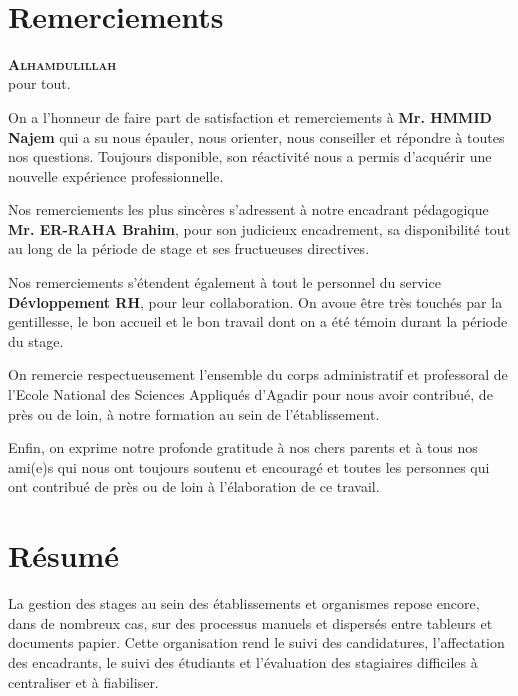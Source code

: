 \documentclass[14pt,a4paper]{article}
\begin{document}
\newpage
\

\vspace*{4cm}
\section*{\huge Remerciements}

\vspace{1.2cm}

\begin{center}
  \textsc{\bfseries Alhamdulillah} \\pour tout.
\end{center}
\vspace{.4cm}

On a l'honneur de faire part de satisfaction et remerciements à \textbf{Mr. HMMID Najem} qui a su nous épauler, nous orienter, nous conseiller et répondre à
toutes nos questions. Toujours disponible, son réactivité nous a permis d'acquérir une nouvelle
expérience professionnelle.

Nos remerciements les plus sincères s'adressent à notre encadrant pédagogique \textbf{Mr. ER-RAHA Brahim}, pour son judicieux encadrement, sa disponibilité tout au long de la
période de stage et ses fructueuses directives.

Nos remerciements s'étendent également à tout le personnel du service \textbf{Dévloppement RH}, pour leur
collaboration. On avoue être très touchés par la gentillesse, le bon accueil et le bon travail dont
on a été témoin durant la période du stage.

On remercie respectueusement l'ensemble du corps administratif et professoral de l'Ecole
National des Sciences Appliqués d'Agadir pour nous avoir contribué, de près ou de loin, à
notre formation au sein de l'établissement.

Enfin, on exprime notre profonde gratitude à nos chers parents et à tous nos ami(e)s qui
nous ont toujours soutenu et encouragé et toutes les personnes qui ont contribué de près ou de
loin à l'élaboration de ce travail.

\newpage
\vspace*{4cm}
\section*{\huge Résumé}
\bigskip
\bigskip
La gestion des stages au sein des établissements et organismes repose encore, dans de nombreux cas, sur des processus manuels et dispersés entre tableurs et documents papier. Cette organisation rend le suivi des candidatures, l'affectation des encadrants, le suivi des étudiants et l'évaluation des stagiaires difficiles à centraliser et à fiabiliser.
\end{document}
